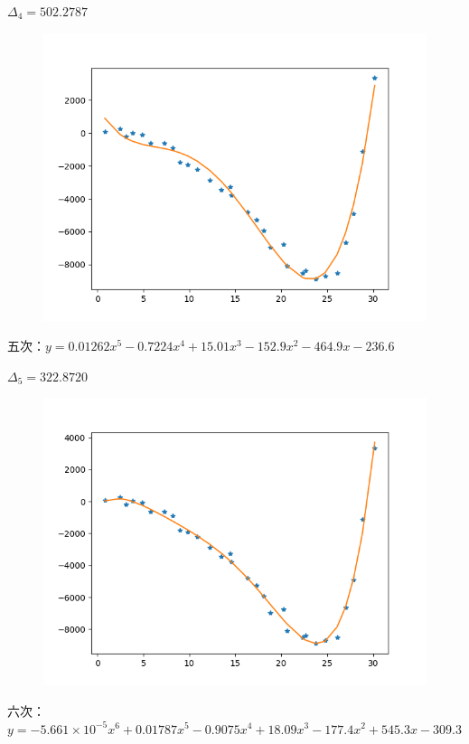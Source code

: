 \documentclass[lang=cn,a4paper]{elegantpaper}
\begin{document}
    $\Delta_4=502.2787$
    \begin{figure}[H]
        \includegraphics[scale=0.4]{1-4.png}
    \end{figure}
    五次：$y=0.01262x^5-0.7224x^4+15.01x^3-152.9x^2-464.9x-236.6$

    $\Delta_5=322.8720$
    \begin{figure}[H]
        \includegraphics[scale=0.4]{1-5.png}
    \end{figure}
    六次：$y=-5.661\times 10^{-5} x^6+0.01787x^5-0.9075x^4+18.09x^3-177.4x^2+545.3x-309.3$
\end{document}
